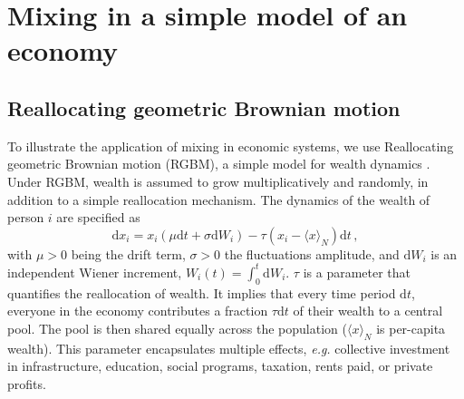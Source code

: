 \documentclass[11pt]{article}
\newcommand{\ie}{{\it i.e.}\xspace}
\newcommand{\eg}{{\it e.g.}\xspace}
\newcommand{\be}{\begin{equation}}
\newcommand{\ee}{\end{equation}}
\numberwithin{equation}{section}
\begin{document}











\section{Mixing in a simple model of an economy}\label{sec:rgbm}
\subsection{Reallocating geometric Brownian motion}

To illustrate the application of mixing in economic systems, we use Reallocating geometric Brownian motion (RGBM), a simple model for wealth dynamics \citep{BermanPetersAdamou2019}. Under RGBM, wealth is assumed to grow multiplicatively and randomly, in addition to a simple reallocation mechanism. The dynamics of the wealth of person $i$ are specified as
%
\be
\mathrm{d} x_i = x_i \left( \mu \mathrm{d}t + \sigma \mathrm{d}W_i \right) - \tau \left( x_i - \langle x \rangle_N \right) \mathrm{d}t\,,
\label{eq:rgbm}
\ee
%
with $\mu > 0$ being the drift term, $\sigma > 0$ the fluctuations amplitude, and $\mathrm{d}W_i$ is an independent Wiener increment, $W_i(t) =\int_0^t \mathrm{d}W_i$. $\tau$ is a parameter that quantifies the reallocation of wealth. It implies that every time period $\mathrm{d}t$, everyone in the economy contributes a fraction $\tau\mathrm{d}t$ of their wealth to a central pool. The pool is then shared equally across the population ($\langle x \rangle_N$ is per-capita wealth). This parameter encapsulates multiple effects, \eg collective investment in infrastructure, education, social programs, taxation, rents paid, or private profits.
\end{document}
